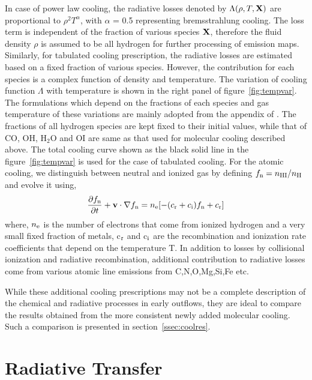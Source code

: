 \documentclass[useAMS,usenatbib]{mn2e}
\begin{document}
In case of power law cooling, the radiative losses denoted by
$\Lambda(\rho,T,{\bf X})$ are proportional to
$\rho^{2}T^{\alpha}$, with $\alpha$ = 0.5 representing bremsstrahlung
cooling. The loss term is independent of the fraction of various
species ${\bf X}$, therefore the fluid density $\rho$ is assumed to be
all hydrogen for further processing of emission maps. Similarly, 
for tabulated cooling prescription, the radiative losses are estimated
based on a fixed fraction of various species. However, the contribution
for each species is a complex function of density and temperature. The
variation of cooling function $\Lambda$ with temperature is shown in
the right panel of figure~\ref{fig:tempvar}. 
The formulations which depend on the fractions of each species and gas
temperature of these variations are mainly adopted from the appendix of \cite{Smith:2003p9985}. 
The fractions of all hydrogen species are kept fixed to their initial values, while that
of CO, OH, H$_{2}$O and OI are same as that used for molecular cooling
described above. The total cooling curve shown as the black solid line
in the figure~\ref{fig:tempvar} is used for the case of tabulated
cooling. For the atomic cooling, we distinguish between neutral
and ionized gas by defining $f_{\rm n} = n_{\rm HI}/n_{\rm H}$ and
evolve it using,
\begin{equation}
\frac{\partial f_{\rm n}}{\partial t} + {\bf{v}}\cdot\nabla f_{\rm n} =
n_{\rm e} [-(c_{\rm r} + c_{\rm i})f_{\rm n} + c_{\rm r}]
\end{equation}
where, $n_{\rm e}$ is the number of electrons that come from ionized
hydrogen and a very small fixed fraction of metals, c$_{\rm r}$ and c$_{\rm i}$ are the recombination and ionization rate coefficients that depend on the temperature T. In
addition to losses by collisional ionization and radiative
recombination, additional contribution to radiative losses come from various atomic line emissions from C,N,O,Mg,Si,Fe etc.

%

While these additional cooling prescriptions may not be a complete description of
the chemical and radiative processes in early outflows, they are ideal
to compare the results obtained from the more consistent newly added molecular
cooling. Such a comparison is presented in section~\ref{ssec:coolres}.


\section{Radiative Transfer}
\label{sec:radtrans}
\end{document}
